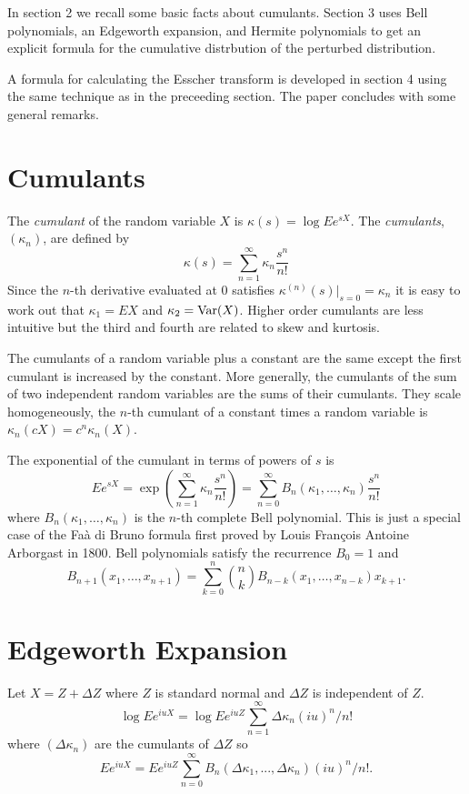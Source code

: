 \documentclass[11pt]{article}
\newcommand{\Var}{\mathop{\rm{Var}}}
\theoremstyle{definition}
\begin{document}
In section 2 we recall some basic facts about cumulants.  Section 3 uses
Bell polynomials,
an Edgeworth expansion, and Hermite polynomials
to get an explicit formula for the cumulative
distrbution of the perturbed distribution.

A formula for calculating the Esscher transform
is developed in section 4 using the same technique
as in the preceeding section. 
The paper concludes with some general remarks.

\section{Cumulants}

The {\em cumulant} of the random variable \(X\)
is \(\kappa(s) = \log Ee^{sX}\).
The {\em cumulants}, \((\kappa_n)\),
are defined by
\[
\kappa(s) = \sum_{n=1}^\infty \kappa_n \frac{s^n}{n!}
\]
Since the \(n\)-th derivative evaluated at \(0\)
satisfies \(\kappa^{(n)}(s)|_{s = 0} = \kappa_n\) 
it is easy to
work out that
\(\kappa_1 = EX\) and \(\kappa_2 = \Var(X)\). Higher order
cumulants are less intuitive but the third and fourth are
related to skew and kurtosis.

The cumulants of a random variable plus a constant are the 
same except the first cumulant is increased by the constant.
More generally, the cumulants of the sum of two independent 
random variables are the sums of their cumulants.
They scale homogeneously, the \(n\)-th cumulant of a constant
times a random variable is
\(\kappa_n(cX) = c^n\kappa_n(X)\).

The exponential of the cumulant in terms of
powers of \(s\) is
\[
Ee^{sX} =  \exp(\sum_{n=1}^\infty \kappa_n \frac{s^n}{n!})
= \sum_{n=0}^\infty B_n(\kappa_1,\dots,\kappa_n) \frac{s^n}{n!}
\]
where \(B_n(\kappa_1,\dots,\kappa_n)\) is the \(n\)-th complete
Bell polynomial.
This is just a special case of the
Fa\`a di Bruno formula first proved by Louis Fran\c{c}ois Antoine
Arborgast in 1800\cite{Arb1800}.
Bell polynomials satisfy the recurrence \cite{Com1974} \(B_0 = 1\) and
\[
B_{n+1}(x_1,\dots,x_{n+1}) = \sum_{k=0}^n \binom{n}{k}
B_{n - k}(x_1,\dots, x_{n - k}) x_{k+1}.
\]

\section{Edgeworth Expansion}
Let \(X = Z + \Delta Z\) where \(Z\) is standard
normal and \(\Delta Z\) is independent of \(Z\).
\[\log E e^{iuX} = \log E e^{iuZ} \sum_{n=1}^\infty \Delta\kappa_n (iu)^n/n!
\]
where \((\Delta\kappa_n)\) are the cumulants 
of \(\Delta Z\) so
\[
Ee^{iuX}= Ee^{iuZ}\sum_{n=0}^\infty B_n(\Delta\kappa_1,...,\Delta\kappa_n)(iu)^n/n!.
\]
\end{document}
